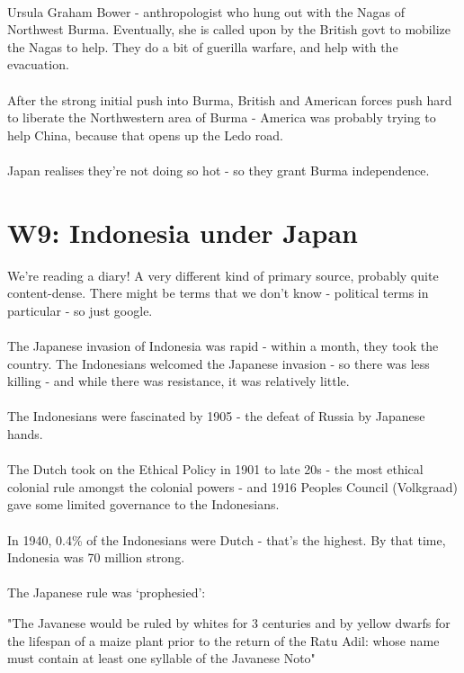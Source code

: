 \documentclass[a4paper]{article}
\begin{document}
\\
Ursula Graham Bower - anthropologist who hung out with the Nagas of Northwest Burma. Eventually, she is called upon by the British govt to mobilize the Nagas to help. They do a bit of guerilla warfare, and help with the evacuation.\\
\\
After the strong initial push into Burma, British and American forces push hard to liberate the Northwestern area of Burma - America was probably trying to help China, because that opens up the Ledo road.\\
\\
Japan realises they're not doing so hot - so they grant Burma independence.
\section{W9: Indonesia under Japan}
We're reading a diary! A very different kind of primary source, probably quite content-dense. There might be terms that we don't know - political terms in particular - so just google.\\
\\
The Japanese invasion of Indonesia was rapid - within a month, they took the country. The Indonesians welcomed the Japanese invasion - so there was less killing - and while there was resistance, it was relatively little.\\
\\
The Indonesians were fascinated by 1905 - the defeat of Russia by Japanese hands.\\
\\
The Dutch took on the Ethical Policy in 1901 to late 20s - the most ethical colonial rule amongst the colonial powers - and 1916 Peoples Council (Volkgraad) gave some limited governance to the Indonesians.\\
\\
In 1940, 0.4\% of the Indonesians were Dutch - that's the highest. By that time, Indonesia was 70 million strong.\\
\\
The Japanese rule was `prophesied':
\begin{framed}
	\begin{displayquote}
		"The Javanese would be ruled by whites for 3 centuries and by yellow dwarfs for the lifespan of a maize plant prior to the return of the Ratu Adil: whose name must contain at least one syllable of the Javanese Noto"
	\end{displayquote}
\end{framed}
\end{document}
